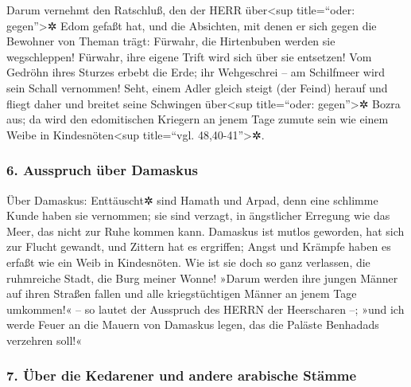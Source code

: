 Darum vernehmt den Ratschluß, den der HERR
über\textless sup title=``oder: gegen''\textgreater✲ Edom gefaßt hat,
und die Absichten, mit denen er sich gegen die Bewohner von Theman
trägt: Fürwahr, die Hirtenbuben werden sie wegschleppen! Fürwahr, ihre
eigene Trift wird sich über sie entsetzen! Vom Gedröhn
ihres Sturzes erbebt die Erde; ihr Wehgeschrei -- am Schilfmeer wird
sein Schall vernommen! Seht, einem Adler gleich steigt
(der Feind) herauf und fliegt daher und breitet seine Schwingen
über\textless sup title=``oder: gegen''\textgreater✲ Bozra aus; da wird
den edomitischen Kriegern an jenem Tage zumute sein wie einem Weibe in
Kindesnöten\textless sup title=``vgl. 48,40-41''\textgreater✲.

\hypertarget{ausspruch-uxfcber-damaskus}{%
\subsubsection{6. Ausspruch über
Damaskus}\label{ausspruch-uxfcber-damaskus}}

Über Damaskus: Enttäuscht✲ sind Hamath und Arpad, denn
eine schlimme Kunde haben sie vernommen; sie sind verzagt, in
ängstlicher Erregung wie das Meer, das nicht zur Ruhe kommen kann.
Damaskus ist mutlos geworden, hat sich zur Flucht
gewandt, und Zittern hat es ergriffen; Angst und Krämpfe haben es erfaßt
wie ein Weib in Kindesnöten. Wie ist sie doch so ganz
verlassen, die ruhmreiche Stadt, die Burg meiner Wonne!
»Darum werden ihre jungen Männer auf ihren Straßen fallen
und alle kriegstüchtigen Männer an jenem Tage umkommen!« -- so lautet
der Ausspruch des HERRN der Heerscharen --; »und ich
werde Feuer an die Mauern von Damaskus legen, das die Paläste Benhadads
verzehren soll!«

\hypertarget{uxfcber-die-kedarener-und-andere-arabische-stuxe4mme}{%
\subsubsection{7. Über die Kedarener und andere arabische
Stämme}\label{uxfcber-die-kedarener-und-andere-arabische-stuxe4mme}}

